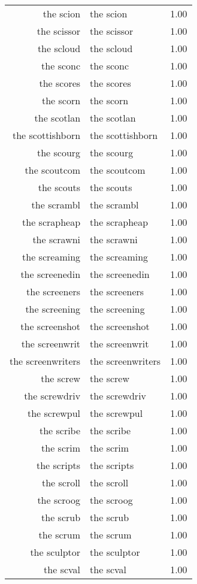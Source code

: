 \begin{table}[ht]
\begin{tabular}{rlr}
  the scion & the scion & 1.00 \\ 
  the scissor & the scissor & 1.00 \\ 
  the scloud & the scloud & 1.00 \\ 
  the sconc & the sconc & 1.00 \\ 
  the scores & the scores & 1.00 \\ 
  the scorn & the scorn & 1.00 \\ 
  the scotlan & the scotlan & 1.00 \\ 
  the scottishborn & the scottishborn & 1.00 \\ 
  the scourg & the scourg & 1.00 \\ 
  the scoutcom & the scoutcom & 1.00 \\ 
  the scouts & the scouts & 1.00 \\ 
  the scrambl & the scrambl & 1.00 \\ 
  the scrapheap & the scrapheap & 1.00 \\ 
  the scrawni & the scrawni & 1.00 \\ 
  the screaming & the screaming & 1.00 \\ 
  the screenedin & the screenedin & 1.00 \\ 
  the screeners & the screeners & 1.00 \\ 
  the screening & the screening & 1.00 \\ 
  the screenshot & the screenshot & 1.00 \\ 
  the screenwrit & the screenwrit & 1.00 \\ 
  the screenwriters & the screenwriters & 1.00 \\ 
  the screw & the screw & 1.00 \\ 
  the screwdriv & the screwdriv & 1.00 \\ 
  the screwpul & the screwpul & 1.00 \\ 
  the scribe & the scribe & 1.00 \\ 
  the scrim & the scrim & 1.00 \\ 
  the scripts & the scripts & 1.00 \\ 
  the scroll & the scroll & 1.00 \\ 
  the scroog & the scroog & 1.00 \\ 
  the scrub & the scrub & 1.00 \\ 
  the scrum & the scrum & 1.00 \\ 
  the sculptor & the sculptor & 1.00 \\ 
  the scval & the scval & 1.00 \\ 

\end{tabular}
\end{table}
